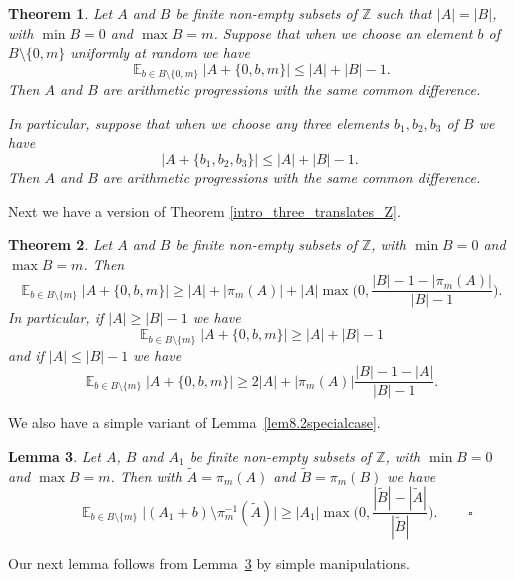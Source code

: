 \documentclass[12pt,reqno]{amsart}
\DeclareMathOperator*{\E}{\mathbb{E}}
\newtheorem{theorem}{Theorem}
\newtheorem{lemma}[theorem]{Lemma}
\theoremstyle{definition}
\renewcommand\leq{\leqslant}
\renewcommand\geq{\geqslant}
\renewcommand\le{\leqslant}
\renewcommand\ge{\geqslant}
\begin{document}
\begin{theorem}\label{equality_four_translates}
  Let $A$ and $B$ be finite non-empty subsets of $\mathbb{Z}$ such that $|A| = |B|$, with $\min B = 0$ and
  $\max B = m$. Suppose that when we choose an element $b$ of $B \setminus \{0,m\}$ uniformly at random we have
\begin{equation}\label{thm23.0.0}
    \E_{b \in B \setminus \{0,m\}} \bigg|A+\{0,b,m\}\bigg| \leq |A|+|B|-1.
\end{equation}
Then $A$ and $B$ are arithmetic progressions with the same common difference.

\vspace{7pt}
In particular, suppose that when we choose any three elements $b_1, b_2, b_3$ of $B$ we have
\[
\bigg|A+\{b_1,b_2,b_3\}\bigg| \le |A|+|B|-1.
\]
Then $A$ and $B$ are arithmetic progressions with the same common difference.
\end{theorem}



Next we have a version of Theorem \ref{intro_three_translates_Z}.

\begin{theorem}\label{technical_three_translates_Z}
Let $A$ and $B$ be finite non-empty subsets of $\mathbb{Z}$, with $\min B  = 0$ and $\max B =m$. Then
$$\E_{b\in B \setminus \{m\}}\bigg|A+\{0,b,m\} \bigg| \ge |A|+|\pi_m(A)|+|A|\max\bigg(0, \frac{|B|-1-|\pi_m(A)|}{|B|-1} \bigg).$$
In particular, if $|A|\geq |B|-1$ we have
$$\E_{b\in B \setminus \{m\}}\bigg|A+\{0,b,m\}\bigg| \ge |A|+|B|-1$$
and if $|A|\leq |B|-1$ we have
$$\E_{b\in B \setminus \{m\}}\bigg|A+\{0,b,m\}\bigg| \ge 2|A| + |\pi_m(A)| \frac{|B|-1-|A|}{|B|-1}.$$
\end{theorem}





We also have a simple variant of Lemma~\ref{lem8.2specialcase}.

\begin{lemma}\label{lem8.2} Let $A$, $B$ and $A_1$ be finite non-empty subsets of $\mathbb{Z}$, with
  $\min B =0$ and $\max B =m$. Then with $\widetilde{A}=\pi_m(A)$ and $\widetilde{B}=\pi_m(B)$ we have
\[
\ \ \ \ \ \ \ \ \ \ \E_{b\in B \setminus \{m\}} \bigg|(A_1+b) \setminus \pi_m^{-1}(\widetilde{A})\bigg| \geq
|A_1| \max\bigg(0,\frac{|\widetilde{B}|-|\widetilde{A}|}{|\widetilde{B}|}\bigg).
\ \ \ \ \ \ \ \ \ \ \square
\]
\end{lemma}


\vspace{7pt}
Our next lemma follows from Lemma~\ref{lem8.2} by simple manipulations.
\end{document}
